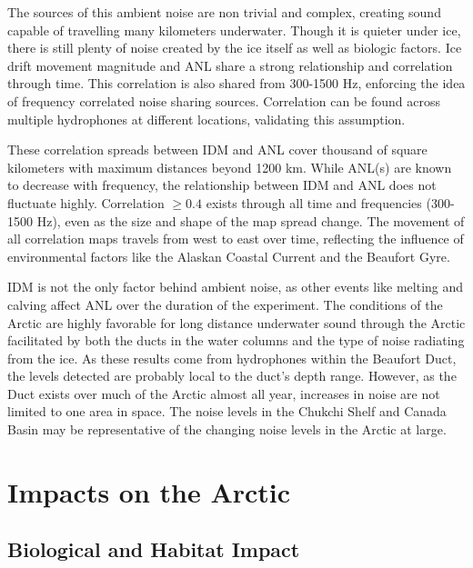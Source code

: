 The sources of this ambient noise are non trivial and complex, creating sound capable of travelling many kilometers underwater. Though it is quieter under ice, there is still plenty of noise created by the ice itself as well as biologic factors. Ice drift movement magnitude and ANL share a strong relationship and correlation through time. This correlation is also shared from 300-1500 Hz, enforcing the idea of frequency correlated noise sharing sources. Correlation can be found across multiple hydrophones at different locations, validating this assumption.

These correlation spreads between IDM and ANL cover thousand of square kilometers with maximum distances beyond 1200 km.  While ANL(s) are known to decrease with frequency, the relationship between IDM and ANL does not fluctuate highly. Correlation $\geq0.4$ exists through all time and frequencies (300-1500 Hz), even as the size and shape of the map spread change. The movement of all correlation maps travels from west to east over time, reflecting the influence of environmental factors like the Alaskan Coastal Current and the Beaufort Gyre. 

IDM is not the only factor behind ambient noise, as other events like melting and calving affect ANL over the duration of the experiment. The conditions of the Arctic are highly favorable for long distance underwater sound through the Arctic facilitated by both the ducts in the water columns and the type of noise radiating from the ice. As these results come from hydrophones within the Beaufort Duct, the levels detected are probably local to the duct's depth range. However, as the Duct exists over much of the Arctic almost all year, increases in noise are not limited to one area in space. The noise levels in the Chukchi Shelf and Canada Basin may be representative of the changing noise levels in the Arctic at large. 




\section{Impacts on the Arctic}

\subsection{Biological and Habitat Impact}


